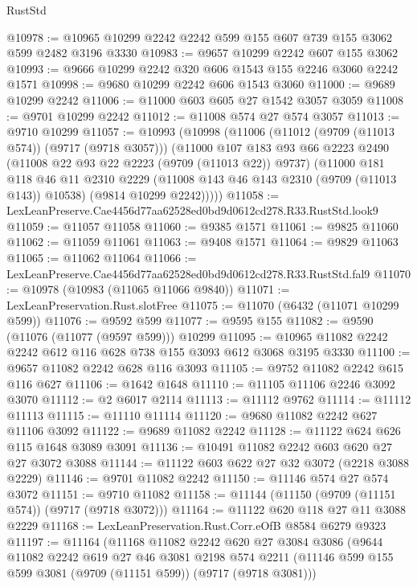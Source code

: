 \begin{lexlean}{RustStd}
\begin{coremodule}
@10978 := @10965 @10299 @2242 @2242 @599 @155 @607 @739 @155 @3062 @599 @2482 @3196 @3330
@10983 := @9657 @10299 @2242 @607 @155 @3062
@10993 := @9666 @10299 @2242 @320 @606 @1543 @155 @2246 @3060 @2242 @1571
@10998 := @9680 @10299 @2242 @606 @1543 @3060
@11000 := @9689 @10299 @2242
@11006 := @11000 @603 @605 @27 @1542 @3057 @3059
@11008 := @9701 @10299 @2242
@11012 := @11008 @574 @27 @574 @3057
@11013 := @9710 @10299
@11057 := @10993
    (@10998
      (@11006
        (@11012 (@9709 (@11013 @574)) (@9717 (@9718 @3057)))
        (@11000
          @107
          @183
          @93
          @66
          @2223
          @2490
          (@11008 @22 @93 @22 @2223 (@9709 (@11013 @22)) @9737)
          (@11000
            @181
            @118
            @46
            @11
            @2310
            @2229
            (@11008 @143 @46 @143 @2310 (@9709 (@11013 @143)) @10538)
            (@9814 @10299 @2242)))))
@11058 := LexLeanPreserve.Cae4456d77aa62528ed0bd9d0612cd278.R33.RustStd.look9
@11059 := @11057 @11058
@11060 := @9385 @1571
@11061 := @9825 @11060
@11062 := @11059 @11061
@11063 := @9408 @1571
@11064 := @9829 @11063
@11065 := @11062 @11064
@11066 := LexLeanPreserve.Cae4456d77aa62528ed0bd9d0612cd278.R33.RustStd.fal9
@11070 := @10978 (@10983 (@11065 @11066 @9840))
@11071 := LexLeanPreservation.Rust.slotFree
@11075 := @11070 (@6432 (@11071 @10299 @599))
@11076 := @9592 @599
@11077 := @9595 @155
@11082 := @9590 (@11076 (@11077 (@9597 @599))) @10299
@11095 := @10965 @11082 @2242 @2242 @612 @116 @628 @738 @155 @3093 @612 @3068 @3195 @3330
@11100 := @9657 @11082 @2242 @628 @116 @3093
@11105 := @9752 @11082 @2242 @615 @116 @627
@11106 := @1642 @1648
@11110 := @11105 @11106 @2246 @3092 @3070
@11112 := @2 @6017 @2114
@11113 := @11112 @9762
@11114 := @11112 @11113
@11115 := @11110 @11114
@11120 := @9680 @11082 @2242 @627 @11106 @3092
@11122 := @9689 @11082 @2242
@11128 := @11122 @624 @626 @115 @1648 @3089 @3091
@11136 := @10491 @11082 @2242 @603 @620 @27 @27 @3072 @3088
@11144 := @11122 @603 @622 @27 @32 @3072 (@2218 @3088 @2229)
@11146 := @9701 @11082 @2242
@11150 := @11146 @574 @27 @574 @3072
@11151 := @9710 @11082
@11158 := @11144 (@11150 (@9709 (@11151 @574)) (@9717 (@9718 @3072)))
@11164 := @11122 @620 @118 @27 @11 @3088 @2229
@11168 := LexLeanPreservation.Rust.Corr.eOfB @8584 @6279 @9323
@11197 := @11164
    (@11168
      @11082
      @2242
      @620
      @27
      @3084
      @3086
      (@9644
        @11082
        @2242
        @619
        @27
        @46
        @3081
        @2198
        @574
        @2211
        (@11146 @599 @155 @599 @3081 (@9709 (@11151 @599)) (@9717 (@9718 @3081)))

\end{coremodule}
\end{lexlean}
